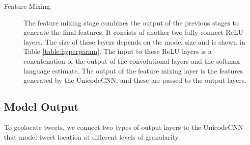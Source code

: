 \documentclass[sigconf,anonymous,review]{acmart}
\begin{document}
\begin{description}

\item[Feature Mixing.]
The feature mixing stage combines the output of the previous stages to generate the final features.
It consists of another two fully connect ReLU layers.
The size of these layers depends on the model size and is shown in Table \ref{table:hyperparam}.
The input to these ReLU layers is a concatenation of the output of the convolutional layers and the softmax language estimate.
The output of the feature mixing layer is the features generated by the UnicodeCNN,
and these are passed to the output layers.


\end{description}


\subsection{Model Output}

To geolocate tweets, we connect two types of output layers to the UnicodeCNN that model tweet location at different levels of granularity.
\end{document}
